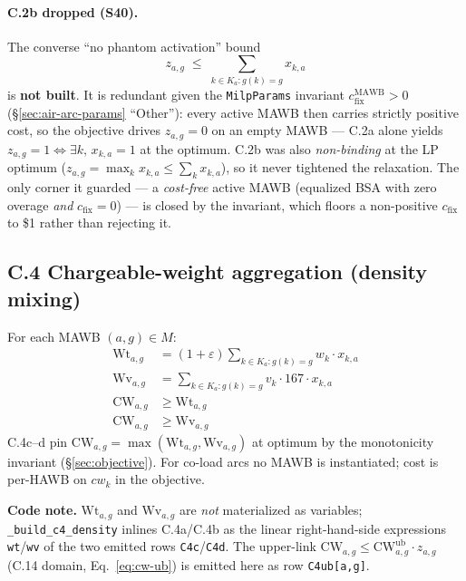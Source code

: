 \documentclass[11pt,a4paper]{article}
\theoremstyle{definition}
\begin{document}
\paragraph{C.2b dropped (S40).} The converse ``no phantom activation'' bound
\begin{equation}
  z_{a,g} \;\leq\; \sum_{k \in K_a : g(k) = g} x_{k,a}
  \tag{C.2b, removed} \label{eq:C2b}
\end{equation}
is \textbf{not built}. It is redundant given the \texttt{MilpParams} invariant $c^{\text{MAWB}}_{\text{fix}} > 0$
(\S\ref{sec:air-arc-params} ``Other''): every active MAWB then carries strictly positive cost, so the
objective drives $z_{a,g}=0$ on an empty MAWB --- C.2a alone yields $z_{a,g} = 1 \iff \exists k,\, x_{k,a}=1$
at the optimum. C.2b was also \emph{non-binding} at the LP optimum ($z_{a,g} = \max_k x_{k,a} \le \sum_k x_{k,a}$),
so it never tightened the relaxation. The only corner it guarded --- a \emph{cost-free} active MAWB
(equalized BSA with zero overage \emph{and} $c_{\text{fix}}=0$) --- is closed by the invariant, which
floors a non-positive $c_{\text{fix}}$ to \$1 rather than rejecting it.

\subsection*{C.4 Chargeable-weight aggregation (density mixing) }

For each MAWB $(a, g) \in M$:
\begin{align}
  \text{Wt}_{a,g} &= (1 + \varepsilon) \sum_{k \in K_a : g(k) = g} w_k \cdot x_{k,a}
    \tag{C.4a} \label{eq:C4a} \\
  \text{Wv}_{a,g} &= \sum_{k \in K_a : g(k) = g} v_k \cdot 167 \cdot x_{k,a}
    \tag{C.4b} \label{eq:C4b} \\
  \text{CW}_{a,g} &\geq \text{Wt}_{a,g}
    \tag{C.4c} \label{eq:C4c} \\
  \text{CW}_{a,g} &\geq \text{Wv}_{a,g}
    \tag{C.4d} \label{eq:C4d}
\end{align}
C.4c--d pin $\text{CW}_{a,g} = \max(\text{Wt}_{a,g}, \text{Wv}_{a,g})$ at
optimum by the monotonicity invariant (\S\ref{sec:objective}). For co-load
arcs no MAWB is instantiated; cost is per-HAWB on $cw_k$ in the objective.

\textbf{Code note.} $\text{Wt}_{a,g}$ and $\text{Wv}_{a,g}$ are \emph{not} materialized as
variables; \texttt{\_build\_c4\_density} inlines C.4a/C.4b as the linear right-hand-side
expressions \texttt{wt}/\texttt{wv} of the two emitted rows \texttt{C4c}/\texttt{C4d}. The
upper-link $\text{CW}_{a,g} \leq \text{CW}^{\text{ub}}_{a,g}\cdot z_{a,g}$ (C.14 domain,
Eq.~\ref{eq:cw-ub}) is emitted here as row \texttt{C4ub[a,g]}.
\end{document}
